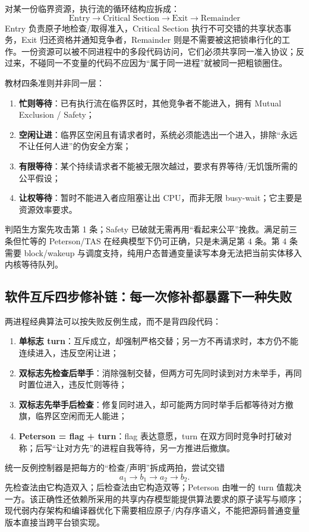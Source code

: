 \documentclass[11pt,a4paper]{ctexart}
\newcommand{\kw}[1]{\textbf{#1}}
\begin{document}
对某一份临界资源，执行流的循环结构应拆成：
\[
\boxed{\text{Entry}\to\text{Critical Section}\to\text{Exit}\to\text{Remainder}}
\]
Entry 负责原子地检查/取得准入，Critical Section 执行不可交错的共享状态事务，Exit 归还资格并通知竞争者，Remainder 则是不需要被这把锁串行化的工作。一份资源可以被不同进程中的多段代码访问，它们必须共享同一准入协议；反过来，不碰同一不变量的代码不应因为“属于同一进程”就被同一把粗锁圈住。

教材四条准则并非同一层：
\begin{enumerate}
\item \kw{忙则等待}：已有执行流在临界区时，其他竞争者不能进入，拥有 Mutual Exclusion / Safety；
\item \kw{空闲让进}：临界区空闲且有请求者时，系统必须能选出一个进入，排除“永远不让任何人进”的伪安全方案；
\item \kw{有限等待}：某个持续请求者不能被无限次越过，要求有界等待/无饥饿所需的公平假设；
\item \kw{让权等待}：暂时不能进入者应阻塞让出 CPU，而非无限 busy-wait；它主要是资源效率要求。
\end{enumerate}
判陌生方案先攻击第 1 条；Safety 已破就无需再用“看起来公平”挽救。满足前三条但忙等的 Peterson/TAS 在经典模型下仍可正确，只是未满足第 4 条。第 4 条需要 block/wakeup 与调度支持，纯用户态普通变量读写本身无法把当前实体移入内核等待队列。

\subsection{软件互斥四步修补链：每一次修补都暴露下一种失败}

两进程经典算法可以按失败反例生成，而不是背四段代码：
\begin{enumerate}
\item \kw{单标志 turn}：互斥成立，却强制严格交替；另一方不再请求时，本方仍不能连续进入，违反空闲让进；
\item \kw{双标志先检查后举手}：消除强制交替，但两方可先同时读到对方未举手，再同时置位进入，违反忙则等待；
\item \kw{双标志先举手后检查}：修复同时进入，却可能两方同时举手后都等待对方撤旗，临界区空闲而无人能进；
\item \kw{Peterson = flag + turn}：flag 表达意愿，turn 在双方同时竞争时打破对称；后写“让对方先”的进程自我等待，另一方推进后撤旗。
\end{enumerate}
统一反例控制器是把每方的“检查/声明”拆成两拍，尝试交错
\[
a_1\to b_1\to a_2\to b_2.
\]
先检查法由它构造双入；后检查法由它构造双等；Peterson 由唯一的 turn 值裁决一方。该正确性还依赖所采用的共享内存模型能提供算法要求的原子读写与顺序；现代弱内存架构和编译器优化下需要相应原子/内存序语义，不能把源码普通变量版本直接当跨平台锁实现。
\end{document}
